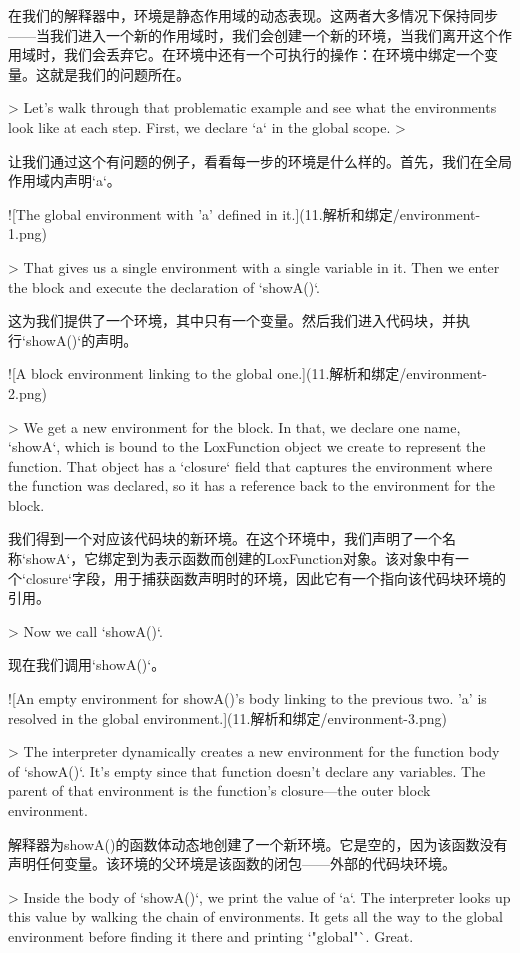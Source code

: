 \documentclass[cn,11pt,chinese]{elegantbook}
\begin{document}
{{{在我们的解释器中，环境是静态作用域的动态表现。这两者大多情况下保持同步——当我们进入一个新的作用域时，我们会创建一个新的环境，当我们离开这个作用域时，我们会丢弃它。在环境中还有一个可执行的操作：在环境中绑定一个变量。这就是我们的问题所在。

> Let’s walk through that problematic example and see what the environments look like at each step. First, we declare `a` in the global scope.
>

让我们通过这个有问题的例子，看看每一步的环境是什么样的。首先，我们在全局作用域内声明`a`。

![The global environment with 'a' defined in it.](11.解析和绑定/environment-1.png)

> That gives us a single environment with a single variable in it. Then we enter the block and execute the declaration of `showA()`.

这为我们提供了一个环境，其中只有一个变量。然后我们进入代码块，并执行`showA()`的声明。

![A block environment linking to the global one.](11.解析和绑定/environment-2.png)

> We get a new environment for the block. In that, we declare one name, `showA`, which is bound to the LoxFunction object we create to represent the function. That object has a `closure` field that captures the environment where the function was declared, so it has a reference back to the environment for the block.

我们得到一个对应该代码块的新环境。在这个环境中，我们声明了一个名称`showA`，它绑定到为表示函数而创建的LoxFunction对象。该对象中有一个`closure`字段，用于捕获函数声明时的环境，因此它有一个指向该代码块环境的引用。

> Now we call `showA()`.

现在我们调用`showA()`。

![An empty environment for showA()'s body linking to the previous two. 'a' is resolved in the global environment.](11.解析和绑定/environment-3.png)

> The interpreter dynamically creates a new environment for the function body of `showA()`. It’s empty since that function doesn’t declare any variables. The parent of that environment is the function’s closure—the outer block environment.

解释器为showA()的函数体动态地创建了一个新环境。它是空的，因为该函数没有声明任何变量。该环境的父环境是该函数的闭包——外部的代码块环境。

> Inside the body of `showA()`, we print the value of `a`. The interpreter looks up this value by walking the chain of environments. It gets all the way to the global environment before finding it there and printing `"global"`. Great.

}}}
\end{document}
